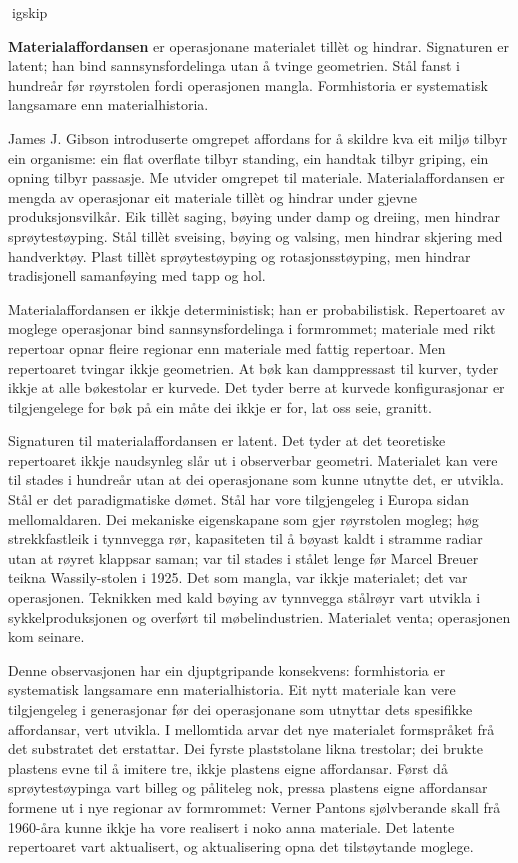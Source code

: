 igskip

\textbf{Materialaffordansen} er operasjonane materialet tillèt og hindrar. Signaturen er latent; han bind sannsynsfordelinga utan å tvinge geometrien. Stål fanst i hundreår før røyrstolen fordi operasjonen mangla. Formhistoria er systematisk langsamare enn materialhistoria.

James J. Gibson introduserte omgrepet affordans for å skildre kva eit miljø tilbyr ein organisme: ein flat overflate tilbyr standing, ein handtak tilbyr griping, ein opning tilbyr passasje. Me utvider omgrepet til materiale. Materialaffordansen er mengda av operasjonar eit materiale tillèt og hindrar under gjevne produksjonsvilkår. Eik tillèt saging, bøying under damp og dreiing, men hindrar sprøytestøyping. Stål tillèt sveising, bøying og valsing, men hindrar skjering med handverktøy. Plast tillèt sprøytestøyping og rotasjonsstøyping, men hindrar tradisjonell samanføying med tapp og hol.

Materialaffordansen er ikkje deterministisk; han er probabilistisk. Repertoaret av moglege operasjonar bind sannsynsfordelinga i formrommet; materiale med rikt repertoar opnar fleire regionar enn materiale med fattig repertoar. Men repertoaret tvingar ikkje geometrien. At bøk kan damppressast til kurver, tyder ikkje at alle bøkestolar er kurvede. Det tyder berre at kurvede konfigurasjonar er tilgjengelege for bøk på ein måte dei ikkje er for, lat oss seie, granitt.

Signaturen til materialaffordansen er latent. Det tyder at det teoretiske repertoaret ikkje naudsynleg slår ut i observerbar geometri. Materialet kan vere til stades i hundreår utan at dei operasjonane som kunne utnytte det, er utvikla. Stål er det paradigmatiske dømet. Stål har vore tilgjengeleg i Europa sidan mellomaldaren. Dei mekaniske eigenskapane som gjer røyrstolen mogleg; høg strekkfastleik i tynnvegga rør, kapasiteten til å bøyast kaldt i stramme radiar utan at røyret klappsar saman; var til stades i stålet lenge før Marcel Breuer teikna Wassily-stolen i 1925. Det som mangla, var ikkje materialet; det var operasjonen. Teknikken med kald bøying av tynnvegga stålrøyr vart utvikla i sykkelproduksjonen og overført til møbelindustrien. Materialet venta; operasjonen kom seinare.

Denne observasjonen har ein djuptgripande konsekvens: formhistoria er systematisk langsamare enn materialhistoria. Eit nytt materiale kan vere tilgjengeleg i generasjonar før dei operasjonane som utnyttar dets spesifikke affordansar, vert utvikla. I mellomtida arvar det nye materialet formspråket frå det substratet det erstattar. Dei fyrste plaststolane likna trestolar; dei brukte plastens evne til å imitere tre, ikkje plastens eigne affordansar. Først då sprøytestøypinga vart billeg og påliteleg nok, pressa plastens eigne affordansar formene ut i nye regionar av formrommet: Verner Pantons sjølvberande skall frå 1960-åra kunne ikkje ha vore realisert i noko anna materiale. Det latente repertoaret vart aktualisert, og aktualisering opna det tilstøytande moglege.


